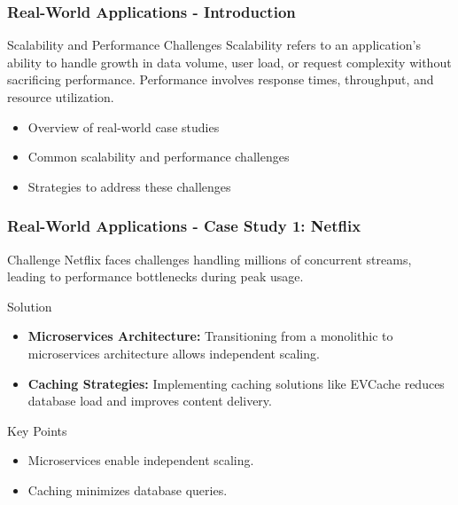 \documentclass[aspectratio=169]{beamer}
\begin{document}
\begin{frame}[fragile]
    \frametitle{Real-World Applications - Introduction}
    \begin{block}{Scalability and Performance Challenges}
        Scalability refers to an application's ability to handle growth in data volume, user load, or request complexity without sacrificing performance. Performance involves response times, throughput, and resource utilization.
    \end{block}
    
    \begin{itemize}
        \item Overview of real-world case studies
        \item Common scalability and performance challenges
        \item Strategies to address these challenges
    \end{itemize}
\end{frame}

\begin{frame}[fragile]
    \frametitle{Real-World Applications - Case Study 1: Netflix}
    \begin{block}{Challenge}
        Netflix faces challenges handling millions of concurrent streams, leading to performance bottlenecks during peak usage.
    \end{block}

    \begin{block}{Solution}
        \begin{itemize}
            \item \textbf{Microservices Architecture:} Transitioning from a monolithic to microservices architecture allows independent scaling.
            \item \textbf{Caching Strategies:} Implementing caching solutions like EVCache reduces database load and improves content delivery.
        \end{itemize}
    \end{block}
    
    \begin{block}{Key Points}
        \begin{itemize}
            \item Microservices enable independent scaling.
            \item Caching minimizes database queries.
        \end{itemize}
    \end{block}
\end{frame}
\end{document}
